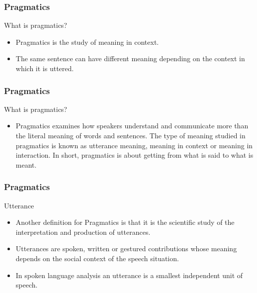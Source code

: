\documentclass[12pt, table]{beamer}
\begin{document}
\begin{frame}
\frametitle{Pragmatics}
What is pragmatics?
\begin{itemize}
\item Pragmatics is the study of meaning in context.
\item The same sentence can have different meaning depending on the context in which it is uttered.
\end{itemize}
\end{frame}

\begin{frame}
\frametitle{Pragmatics}
What is pragmatics?
\begin{itemize}
\item Pragmatics examines how speakers understand and communicate more than the literal meaning of words and sentences. The type of meaning studied in pragmatics is known as utterance meaning, meaning in context or meaning in interaction. In short, pragmatics is about getting from what is said to what is meant.\\
\hfill \citet[161]{becker2006intro} 
\end{itemize}
\end{frame}

\begin{frame}
\frametitle{Pragmatics}
Utterance
\begin{itemize}
\item Another definition for Pragmatics is that it is the scientific study of the interpretation and production of utterances. 
\item Utterances are spoken, written or gestured contributions whose meaning depends on the social context of the speech situation.
\item In spoken language analysis an utterance is a smallest independent unit of speech. 
\end{itemize}
\end{frame}
\end{document}
